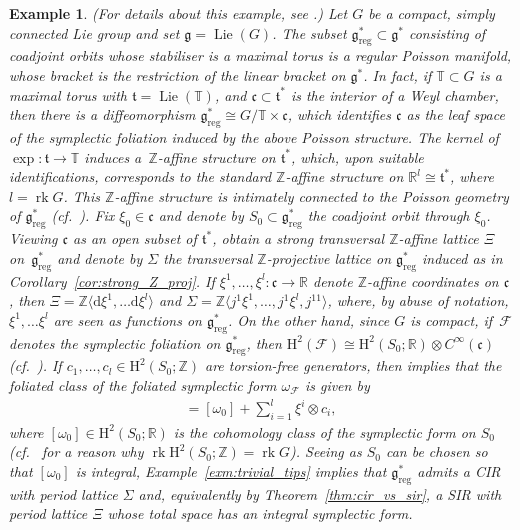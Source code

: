 \documentclass[10pt,a4paper]{amsart}
\numberwithin{equation}{section}
\newtheorem{Example}[Theorem]{Example}
\newcommand{\de}{\mathrm{d}} %
\newcommand{\HH}{\mathrm{H}}
\newcommand{\RR}{\mathbb{R}}
\newcommand{\ZZ}{\mathbb{Z}}
\begin{document}
\begin{Example}\label{exm:cpc_ss_Lie_algebras} (For details about this example, see \cite[Section~4.5.1]{PMCT2}.) Let $G$ be a compact, simply connected Lie group and set $\mathfrak{g} = \operatorname{Lie}(G)$. The subset $\mathfrak{g}^*_{\mathrm{reg}} \subset \mathfrak{g}^*$ consisting of coadjoint orbits whose stabiliser is a maximal torus is a regular Poisson manifold, whose bracket is the restriction of the linear bracket on $\mathfrak{g}^*$. In fact, if $\mathbb{T} \subset G$ is a maximal torus with $\mathfrak{t} = \operatorname{Lie}(\mathbb{T})$, and $\mathfrak{c} \subset \mathfrak{t}^*$ is the interior of a Weyl chamber, then there is a dif\/feomorphism $\mathfrak{g}^*_{\mathrm{reg}} \cong G/\mathbb{T} \times \mathfrak{c}$, which identif\/ies $\mathfrak{c}$ as the leaf space of the symplectic foliation induced by the above Poisson structure. The kernel of $\exp \colon \mathfrak{t} \to \mathbb{T}$ induces a~$\ZZ$-af\/f\/ine structure on $\mathfrak{t}^*$, which, upon suitable identif\/ications, corresponds to the standard $\ZZ$-af\/f\/ine structure on $\RR^l \cong \mathfrak{t}^*$, where $l = \operatorname{rk} G$. This $\ZZ$-af\/f\/ine structure is intimately connected to the Poisson geometry of $\mathfrak{g}_{\mathrm{reg}}^*$ (cf.\ \cite[Section~4.5.1]{PMCT2}). Fix $\xi_0 \in \mathfrak{c}$ and denote by $S_0 \subset \mathfrak{g}^*_{\mathrm{reg}}$ the coadjoint orbit through $\xi_0$. Viewing $\mathfrak{c} $ as an open subset of $ \mathfrak{t}^*$, obtain a strong transversal $\ZZ$-af\/f\/ine lattice $\Xi$ on~$\mathfrak{g}^*_{\mathrm{reg}}$ and denote by $\Sigma$ the transversal $\ZZ$-projective lattice on $\mathfrak{g}^*_{\mathrm{reg}}$ induced as in Corollary~\ref{cor:strong_Z_proj}. If $\xi^1,\ldots,\xi^l\colon \mathfrak{c} \to \RR$ denote $\ZZ$-af\/f\/ine coordinates on $\mathfrak{c}$, then $\Xi = \ZZ \langle \de \xi^1,\ldots \de \xi^l\rangle $ and $\Sigma = \ZZ \langle j^1\xi^1,\ldots,j^1\xi^l,j^11\rangle$, where, by abuse of notation, $\xi^1,\ldots \xi^l$ are seen as functions on $\mathfrak{g}^*_{\mathrm{reg}}$. On the other hand, since $G$ is compact, if~$\mathcal{F}$ denotes the symplectic foliation on $\mathfrak{g}^*_{\mathrm{reg}}$, then $\HH^2(\mathcal{F}) \cong \HH^2(S_0;\RR) \otimes C^{\infty}(\mathfrak{c})$ (cf.\ \cite{kacimi}). If $c_1,\ldots,c_l \in \HH^2(S_0;\ZZ)$ are torsion-free generators, then \cite[Remark~4.3.5]{PMCT2} implies that the foliated class of the foliated symplectic form
 $\omega_{\mathcal{F}}$ is given by
 \begin{gather*}
 [\omega_{\mathcal{F}}] = [\omega_0] + \sum\limits_{i=1}^l \xi^i \otimes c_i,
 \end{gather*}
where $[\omega_0] \in \HH^2(S_0;\RR)$ is the cohomology class of the symplectic form on $S_0$ (cf.\ \cite[Section~4.5.1]{PMCT2} for a reason why $\operatorname{rk} \HH^2(S_0;\ZZ) = \operatorname{rk} G$). Seeing as $S_0$ can be chosen so that $[\omega_0]$ is integral, Example~\ref{exm:trivial_tips} implies that $\mathfrak{g}^*_{\mathrm{reg}}$ admits a CIR with period lattice $\Sigma$ and, equivalently by Theorem~\ref{thm:cir_vs_sir}, a SIR with period lattice $\Xi$ whose total space has an integral symplectic form.


\end{Example}
\end{document}

